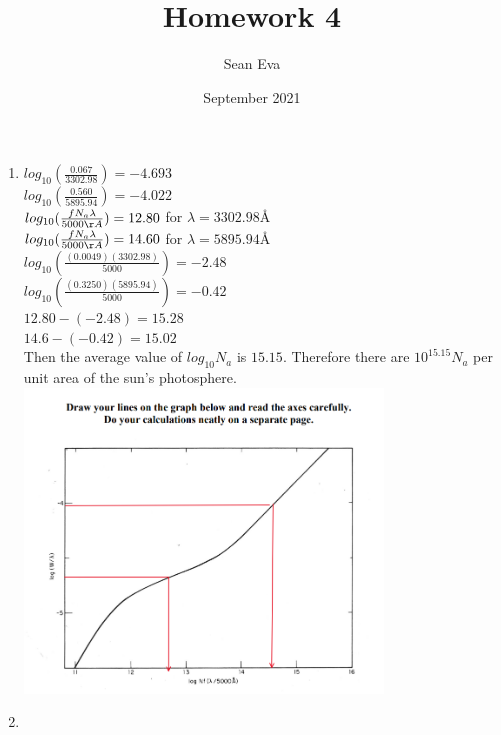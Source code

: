 \documentclass{article}
\title{Homework 4}
\author{Sean Eva}
\date{September 2021}
\begin{document}
\maketitle

\begin{enumerate}
    \item 
    
    $log_{10}(\frac{0.067}{3302.98})=-4.693$\\
    $log_{10}(\frac{0.560}{5895.94})=-4.022$\\
    $log_{10}(\frac{fN_a\lambda}{5000\AA})=12.80$ for $\lambda=3302.98$\AA\\
    $log_{10}(\frac{fN_a\lambda}{5000\AA})=14.60$ for $\lambda=5895.94$\AA\\
    $log_{10}(\frac{(0.0049)(3302.98)}{5000})=-2.48$\\
    $log_{10}(\frac{(0.3250)(5895.94)}{5000})=-0.42$\\
    $12.80-(-2.48)=15.28$\\
    $14.6-(-0.42)=15.02$\\
    Then the average value of $log_{10}N_a$ is $15.15$. Therefore there are $10^{15.15}N_a$ per unit area of the sun's photosphere.\\
    \includegraphics[width=0.75\textwidth]{Graph for HW3.png}
    
    \item
    

\end{enumerate}
\end{document}
